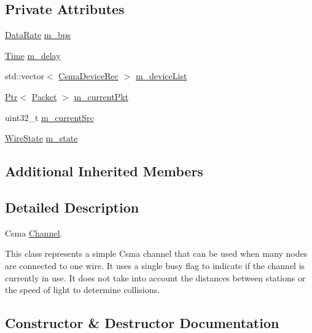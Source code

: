 \subsection*{Private Attributes}
\begin{DoxyCompactItemize}
\item 
\hyperlink{classns3_1_1DataRate}{Data\+Rate} \hyperlink{classns3_1_1CsmaChannel_a425f675d8d438b5616541c1066b191ff}{m\+\_\+bps}
\item 
\hyperlink{classns3_1_1Time}{Time} \hyperlink{classns3_1_1CsmaChannel_a7289f240118c52453fbac6b9b74ff83e}{m\+\_\+delay}
\item 
std\+::vector$<$ \hyperlink{classns3_1_1CsmaDeviceRec}{Csma\+Device\+Rec} $>$ \hyperlink{classns3_1_1CsmaChannel_ac4ee712a3f3f4219c687bf1595f7b1a6}{m\+\_\+device\+List}
\item 
\hyperlink{classns3_1_1Ptr}{Ptr}$<$ \hyperlink{classns3_1_1Packet}{Packet} $>$ \hyperlink{classns3_1_1CsmaChannel_aa6402963543ed7ae413acb321a66101b}{m\+\_\+current\+Pkt}
\item 
uint32\+\_\+t \hyperlink{classns3_1_1CsmaChannel_af6c1065e71e65be876ab8968c9d54c83}{m\+\_\+current\+Src}
\item 
\hyperlink{namespacens3_aff37503a9e9f2dbe82b374050a73e105}{Wire\+State} \hyperlink{classns3_1_1CsmaChannel_a9c0532c38d511b589274e726ad41037f}{m\+\_\+state}
\end{DoxyCompactItemize}
\subsection*{Additional Inherited Members}


\subsection{Detailed Description}
Csma \hyperlink{classns3_1_1Channel}{Channel}. 

This class represents a simple Csma channel that can be used when many nodes are connected to one wire. It uses a single busy flag to indicate if the channel is currently in use. It does not take into account the distances between stations or the speed of light to determine collisions. 

\subsection{Constructor \& Destructor Documentation}
